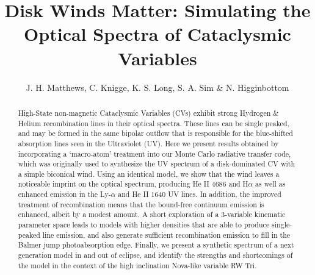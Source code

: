 \documentclass[preprint, a4paper, 11pt]{aastex}
\begin{document}

\renewcommand{\labelitemi}{$-$}
\def\py{\textsc{Python} }
\def\tar{\textsc{Tardis} }
\def\cld{\textsc{Cloudy} }
\def\civ{C~\textsc{iv} }
\def\araa{ARAA}
\def\nat{Nature}
\def\apjl{ApJ Letters}
\def\aapr{AAPR}
\def\ssr{SSR}
\def\apj{ApJ}
\def\pasp{PASP}
\def\aap{A\&A}
\def\mnras{MNRAS}
\def\aj{AJ}
\def\rmxaa{RMXAA}

\def\heiiopt{He~\textsc{ii}~$\lambda4686{\rm \AA}$}
\def\heiiuv{He~\textsc{ii}~$\lambda1640{\rm \AA}$}
\def\heiioptnew{He~\textsc{ii}~$\lambda3202{\rm \AA}$}
\def\la{Ly-$\alpha$}
\def\ha{H$\alpha$}
\def\hb{H$\beta$}

%
%


\title{Disk Winds Matter: Simulating the Optical Spectra of Cataclysmic Variables}
\author{J. H. Matthews, C. Knigge, K. S. Long, S. A. Sim \& N. Higginbottom}


%
%

\begin{abstract}
High-State non-magnetic Cataclysmic Variables (CVs) 
exhibit strong Hydrogen \& Helium recombination lines in their optical 
spectra. These lines can be single peaked, and may be formed 
in the same bipolar outflow that is responsible for the
blue-shifted absorption lines seen in the Ultraviolet (UV).
Here we present results obtained by incorporating a `macro-atom' treatment into
our Monte Carlo radiative transfer code, which was
originally used to synthesize the UV spectrum of a disk-dominated CV 
with a simple biconical wind. Using an identical model, we show that the wind leaves a noticeable imprint 
on the optical spectrum, producing He II 4686 and H${\alpha}$ as well as
enhanced emission in the Ly-$\alpha$ and He II $1640$ UV lines.
In addition, the improved treatment of recombination means that the bound-free continuum
emission is enhanced, albeit by a modest amount.
A short exploration of a 3-variable kinematic parameter space leads to models with higher densities 
that are able to produce single-peaked line emission, and also generate sufficient recombination emission
to fill in the Balmer jump photoabsorption edge. 
Finally, we present a synthetic spectrum of a next generation model in and out of eclipse,
and identify the strengths and shortcomings of the model in the context of the high inclination
Nova-like variable RW Tri.
\end{abstract}
\end{document}

